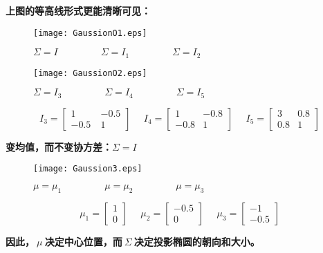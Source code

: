 \newpage
\noindent\textbf{上图的等高线形式更能清晰可见：}
\begin{figure}[!h]
  \centering
  \texttt{[image: GaussionO1.eps]}
  \caption{$\Sigma=I~~~~~~~~~~~~~~~~~~~~\Sigma=I_1~~~~~~~~~~~~~~~~~~~~\Sigma=I_2$}
\end{figure}

\begin{figure}[!h]
  \centering
  \texttt{[image: GaussionO2.eps]}
  \caption{$\Sigma=I_3~~~~~~~~~~~~~~~~~~~~\Sigma=I_4~~~~~~~~~~~~~~~~~~~~\Sigma=I_5$}
\end{figure}
$$I_3=\begin{bmatrix}
      1 & -0.5 \\
      -0.5~ & 1
    \end{bmatrix}~~~~~~I_4=\begin{bmatrix}
                      1 & -0.8 \\
                      -0.8 & 1
                    \end{bmatrix}~~~~~~I_5=\begin{bmatrix}
                                            3 & 0.8 \\
                                            0.8 & 1
                                          \end{bmatrix}$$


\noindent\textbf{变均值，而不变协方差：}$\Sigma=I$
\begin{figure}[!h]
  \centering
  \texttt{[image: Gaussion3.eps]}
  \caption{$\mu=\mu_1~~~~~~~~~~~~~~~~~~~~\mu=\mu_2~~~~~~~~~~~~~~~~~~~~\mu=\mu_3$}
\end{figure}
$$\mu_1=\begin{bmatrix}
      1  \\
      0
    \end{bmatrix}~~~~~~\mu_2=\begin{bmatrix}
                      -0.5\\
                       0
                    \end{bmatrix}~~~~~~\mu_3=\begin{bmatrix}
                                            -1\\
                                            -0.5
                                          \end{bmatrix}$$

\noindent\textbf{因此，$~\mu~$决定中心位置，而$~\Sigma~$决定投影椭圆的朝向和大小。}

